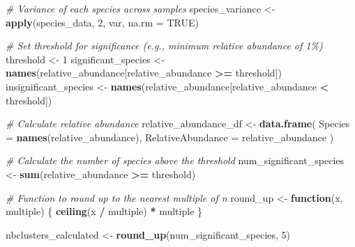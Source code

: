 \documentclass[
]{article}
\newenvironment{Shaded}{\begin{snugshade}}{\end{snugshade}}
\newcommand{\AttributeTok}[1]{\textcolor[rgb]{0.13,0.29,0.53}{#1}}
\newcommand{\CommentTok}[1]{\textcolor[rgb]{0.56,0.35,0.01}{\textit{#1}}}
\newcommand{\ConstantTok}[1]{\textcolor[rgb]{0.56,0.35,0.01}{#1}}
\newcommand{\ControlFlowTok}[1]{\textcolor[rgb]{0.13,0.29,0.53}{\textbf{#1}}}
\newcommand{\DecValTok}[1]{\textcolor[rgb]{0.00,0.00,0.81}{#1}}
\newcommand{\FunctionTok}[1]{\textcolor[rgb]{0.13,0.29,0.53}{\textbf{#1}}}
\newcommand{\NormalTok}[1]{#1}
\newcommand{\OtherTok}[1]{\textcolor[rgb]{0.56,0.35,0.01}{#1}}
\newcommand{\SpecialCharTok}[1]{\textcolor[rgb]{0.81,0.36,0.00}{\textbf{#1}}}
\begin{document}
\begin{Shaded}
\begin{Highlighting}[]
\CommentTok{\# Variance of each species across samples}
\NormalTok{species\_variance }\OtherTok{\textless{}{-}} \FunctionTok{apply}\NormalTok{(species\_data, }\DecValTok{2}\NormalTok{, var, }\AttributeTok{na.rm =} \ConstantTok{TRUE}\NormalTok{)}

\CommentTok{\# Set threshold for significance (e.g., minimum relative abundance of 1\%)}
\NormalTok{threshold }\OtherTok{\textless{}{-}} \DecValTok{1}
\NormalTok{significant\_species }\OtherTok{\textless{}{-}} \FunctionTok{names}\NormalTok{(relative\_abundance[relative\_abundance }\SpecialCharTok{\textgreater{}=}\NormalTok{ threshold])}
\NormalTok{insignificant\_species }\OtherTok{\textless{}{-}} \FunctionTok{names}\NormalTok{(relative\_abundance[relative\_abundance }\SpecialCharTok{\textless{}}\NormalTok{ threshold])}

\CommentTok{\# Calculate relative abundance}
\NormalTok{relative\_abundance\_df }\OtherTok{\textless{}{-}} \FunctionTok{data.frame}\NormalTok{(}
  \AttributeTok{Species =} \FunctionTok{names}\NormalTok{(relative\_abundance),}
  \AttributeTok{RelativeAbundance =}\NormalTok{ relative\_abundance}
\NormalTok{)}

\CommentTok{\# Calculate the number of species above the threshold}
\NormalTok{num\_significant\_species }\OtherTok{\textless{}{-}} \FunctionTok{sum}\NormalTok{(relative\_abundance }\SpecialCharTok{\textgreater{}=}\NormalTok{ threshold)}

\CommentTok{\# Function to round up to the nearest multiple of n}
\NormalTok{round\_up }\OtherTok{\textless{}{-}} \ControlFlowTok{function}\NormalTok{(x, multiple) \{}
  \FunctionTok{ceiling}\NormalTok{(x }\SpecialCharTok{/}\NormalTok{ multiple) }\SpecialCharTok{*}\NormalTok{ multiple}
\NormalTok{\}}

\NormalTok{nbclusters\_calculated }\OtherTok{\textless{}{-}} \FunctionTok{round\_up}\NormalTok{(num\_significant\_species, }\DecValTok{5}\NormalTok{)}


\end{Highlighting}
\end{Shaded}
\end{document}
